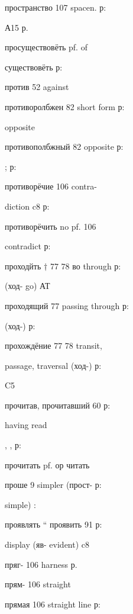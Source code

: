 \clearpage
\thispagestyle{plain}
\begingroup
\cyrillicfont
\fontsize{7.25}{8.25}\selectfont
\setlength{\parindent}{0pt}
\setlength{\parskip}{0pt}
\setlength{\emergencystretch}{1.5em}
\noindent
\begin{minipage}[t]{0.475\textwidth}
\raggedright
\noindent пространство 107 spacen. р:\par
\noindent А15 р.\par
\noindent просуществовёть pf. of\par
\noindent существовёть р:\par
\noindent против 52 against\par
\noindent противоролбжен 82 short form р:\par
\noindent opposite\par
\noindent противополбжный 82 opposite р:\par
\noindent ; р:\par
\noindent противорёчие 106 contra-\par
\noindent diction c8 р:\par
\noindent противорёчить no pf. 106\par
\noindent contradict р:\par
\noindent проходйть $\dagger$ 77 78 во through р:\par
\noindent (ход- go) АТ\par
\noindent проходящий 77 passing through р:\par
\noindent (ход-) р:\par
\noindent прохождёние 77 78 transit,\par
\noindent passage, traversal (ход-) р:\par
\noindent C5\par
\noindent прочитав, прочитавший 60 р:\par
\noindent having read\par
\noindent , , р:\par
\noindent прочитать pf. ор читать\par
\noindent проше 9 simpler (прост- р:\par
\noindent simple) :\par
\noindent проявлять “ проявить 91 р:\par
\noindent display (яв- evident) c8\par
\noindent пряг- 106 harness р.\par
\noindent прям- 106 straight\par
\noindent прямая 106 straight line р:\par

\end{minipage}
